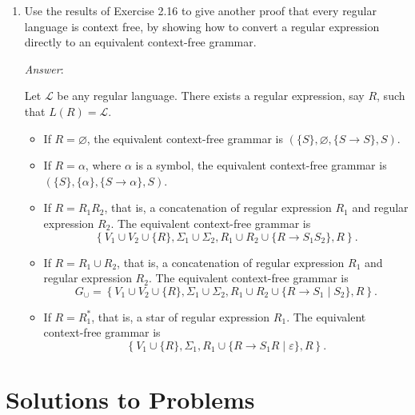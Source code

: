 \begin{enumerate}[font=\bfseries,label=2.\arabic*]
\item Use the results of Exercise 2.16 to give another proof that every regular language is context free, by showing how to convert a regular expression directly to an equivalent context-free grammar.

\emph{Answer}:

Let $\mathcal L$ be any regular language. There exists a regular expression, say $R$, such that $L(R)=\mathcal L$.

\begin{itemize}
    \item If $R=\varnothing$, the equivalent context-free grammar is $(\{S\},\varnothing,\{S\rightarrow S\},S)$.
    
    \item If $R=\alpha$, where $\alpha$ is a symbol, the equivalent context-free grammar is $(\{S\},\{\alpha\},\{S\rightarrow \alpha\},S)$.
    
    \item If $R=R_1R_2$, that is, a concatenation of regular expression $R_1$ and regular expression $R_2$. The equivalent context-free grammar is $$\left\{V_1\cup V_2\cup\{R\},\Sigma_1\cup\Sigma_2,R_1\cup R_2\cup\{R\rightarrow S_1 S_2\},R\right\}.$$
    
    \item If $R=R_1\cup R_2$, that is, a concatenation of regular expression $R_1$ and regular expression $R_2$. The equivalent context-free grammar is $$G_\cup=\left\{V_1\cup V_2\cup\{R\},\Sigma_1\cup\Sigma_2,R_1\cup R_2\cup\{R\rightarrow S_1\mid S_2\},R\right\}.$$
    
    \item If $R=R_1^\ast$, that is, a star of regular expression $R_1$. The equivalent context-free grammar is $$\left\{V_1\cup \{R\},\Sigma_1,R_1\cup \{R\rightarrow S_1R\mid\varepsilon\},R\right\}.$$
\end{itemize}

\end{enumerate}

\section*{Solutions to Problems}

